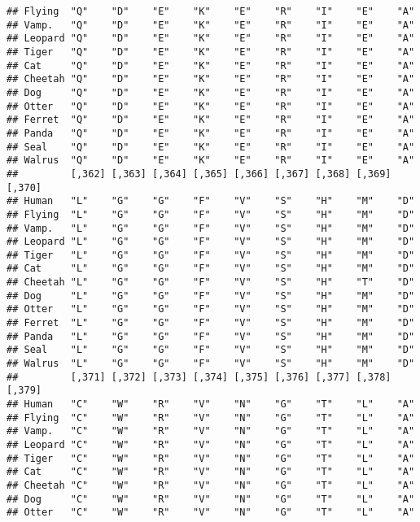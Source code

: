 \documentclass[]{article}
\begin{document}
\begin{verbatim}
## Flying  "Q"    "D"    "E"    "K"    "E"    "R"    "I"    "E"    "A"   
## Vamp.   "Q"    "D"    "E"    "K"    "E"    "R"    "I"    "E"    "A"   
## Leopard "Q"    "D"    "E"    "K"    "E"    "R"    "I"    "E"    "A"   
## Tiger   "Q"    "D"    "E"    "K"    "E"    "R"    "I"    "E"    "A"   
## Cat     "Q"    "D"    "E"    "K"    "E"    "R"    "I"    "E"    "A"   
## Cheetah "Q"    "D"    "E"    "K"    "E"    "R"    "I"    "E"    "A"   
## Dog     "Q"    "D"    "E"    "K"    "E"    "R"    "I"    "E"    "A"   
## Otter   "Q"    "D"    "E"    "K"    "E"    "R"    "I"    "E"    "A"   
## Ferret  "Q"    "D"    "E"    "K"    "E"    "R"    "I"    "E"    "A"   
## Panda   "Q"    "D"    "E"    "K"    "E"    "R"    "I"    "E"    "A"   
## Seal    "Q"    "D"    "E"    "K"    "E"    "R"    "I"    "E"    "A"   
## Walrus  "Q"    "D"    "E"    "K"    "E"    "R"    "I"    "E"    "A"   
##         [,362] [,363] [,364] [,365] [,366] [,367] [,368] [,369] [,370]
## Human   "L"    "G"    "G"    "F"    "V"    "S"    "H"    "M"    "D"   
## Flying  "L"    "G"    "G"    "F"    "V"    "S"    "H"    "M"    "D"   
## Vamp.   "L"    "G"    "G"    "F"    "V"    "S"    "H"    "M"    "D"   
## Leopard "L"    "G"    "G"    "F"    "V"    "S"    "H"    "M"    "D"   
## Tiger   "L"    "G"    "G"    "F"    "V"    "S"    "H"    "M"    "D"   
## Cat     "L"    "G"    "G"    "F"    "V"    "S"    "H"    "M"    "D"   
## Cheetah "L"    "G"    "G"    "F"    "V"    "S"    "H"    "T"    "D"   
## Dog     "L"    "G"    "G"    "F"    "V"    "S"    "H"    "M"    "D"   
## Otter   "L"    "G"    "G"    "F"    "V"    "S"    "H"    "M"    "D"   
## Ferret  "L"    "G"    "G"    "F"    "V"    "S"    "H"    "M"    "D"   
## Panda   "L"    "G"    "G"    "F"    "V"    "S"    "H"    "M"    "D"   
## Seal    "L"    "G"    "G"    "F"    "V"    "S"    "H"    "M"    "D"   
## Walrus  "L"    "G"    "G"    "F"    "V"    "S"    "H"    "M"    "D"   
##         [,371] [,372] [,373] [,374] [,375] [,376] [,377] [,378] [,379]
## Human   "C"    "W"    "R"    "V"    "N"    "G"    "T"    "L"    "A"   
## Flying  "C"    "W"    "R"    "V"    "N"    "G"    "T"    "L"    "A"   
## Vamp.   "C"    "W"    "R"    "V"    "N"    "G"    "T"    "L"    "A"   
## Leopard "C"    "W"    "R"    "V"    "N"    "G"    "T"    "L"    "A"   
## Tiger   "C"    "W"    "R"    "V"    "N"    "G"    "T"    "L"    "A"   
## Cat     "C"    "W"    "R"    "V"    "N"    "G"    "T"    "L"    "A"   
## Cheetah "C"    "W"    "R"    "V"    "N"    "G"    "T"    "L"    "A"   
## Dog     "C"    "W"    "R"    "V"    "N"    "G"    "T"    "L"    "A"   
## Otter   "C"    "W"    "R"    "V"    "N"    "G"    "T"    "L"    "A"   

\end{verbatim}
\end{document}
